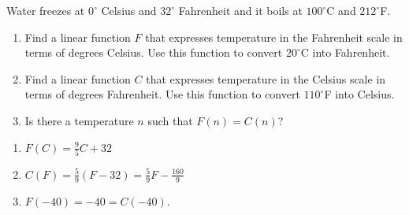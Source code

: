 {Water freezes at $0^{\circ}$ Celsius and $32^{\circ}$ Fahrenheit and it boils at $100^{\circ}$C and $212^{\circ}$F.  
\label{celsiustofahr}

\begin{enumerate}

\item Find a linear function $F$ that expresses temperature in the Fahrenheit scale in terms of degrees Celsius.  Use this function to convert $20^{\circ}$C into Fahrenheit.

\item Find a linear function $C$ that expresses temperature in the Celsius scale in terms of degrees Fahrenheit.  Use this function to convert $110^{\circ}$F into Celsius.

\item Is there a temperature $n$ such that $F(n) = C(n)$?

\end{enumerate}}
{\begin{enumerate}

\item $F(C) = \frac{9}{5}C + 32$
\item $C(F) = \frac{5}{9}(F - 32) = \frac{5}{9}F - \frac{160}{9}$
\item $F(-40) = -40 = C(-40)$.

\end{enumerate}}